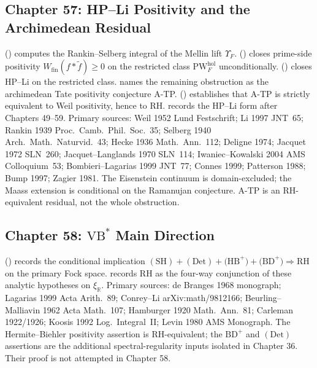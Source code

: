 \subsection{Chapter 57: HP--Li Positivity and the Archimedean Residual}
\label{v4-arith:w5-synth:ch57}

 (\ClaimStatusProvedHere)
computes the Rankin--Selberg integral of the Mellin lift
\(\Upsilon_{F}\).
 (\ClaimStatusProvedHere) closes
prime-side positivity
\(W_{\mathrm{fin}}(f*\widetilde{f})\geq 0\) on the restricted class
\(\mathrm{PW}^{\mathrm{hol}}_{F}\) unconditionally.
 (\ClaimStatusProvedHere)
closes HP--Li on the restricted class.
 names the
remaining obstruction as the archimedean Tate positivity conjecture
A-TP.
 (\ClaimStatusProvedHere)
establishes that A-TP is strictly equivalent to Weil positivity, hence
to RH.
 records the HP--Li form
after Chapters 49--59.
Primary sources: Weil 1952 Lund Festschrift; Li 1997 JNT~65;
Rankin 1939 Proc.~Camb.~Phil.~Soc.~35;
Selberg 1940 Arch.~Math.~Naturvid.~43; Hecke 1936 Math.~Ann.~112;
Deligne 1974; Jacquet 1972 SLN~260; Jacquet--Langlands 1970 SLN~114;
Iwaniec--Kowalski 2004 AMS Colloquium~53; Bombieri--Lagarias 1999
JNT~77; Connes 1999; Patterson 1988; Bump 1997; Zagier 1981.
The Eisenstein continuum is domain-excluded; the Maass extension is
conditional on the Ramanujan conjecture. A-TP is an RH-equivalent
residual, not the whole obstruction.

\subsection{Chapter 58: \(\mathrm{VB}^{*}\) Main Direction}
\label{v4-arith:w5-synth:ch58}

 (\ClaimStatusProvedHereConditional)
records the conditional implication
\(\mathrm{(SH)}+\mathrm{(Det)}+\mathrm{(HB}^{+})+\mathrm{(BD}^{+})
\Rightarrow \mathrm{RH}\) on the primary Fock space.
 records RH as the four-way
conjunction of these analytic hypotheses on \(\xi_{\mathbb{R}}\).
Primary sources: de Branges 1968 monograph; Lagarias 1999 Acta Arith.~89;
Conrey--Li arXiv:math/9812166; Beurling--Malliavin 1962
Acta Math.~107; Hamburger 1920 Math.~Ann.~81; Carleman 1922/1926;
Koosis 1992 Log.~Integral~II; Levin 1980 AMS Monograph.
The Hermite--Biehler positivity assertion is RH-equivalent; the
\(\mathrm{BD}^{+}\) and \(\mathrm{(Det)}\) assertions are the
additional spectral-regularity inputs isolated in Chapter 36. Their
proof is not attempted in Chapter 58.

